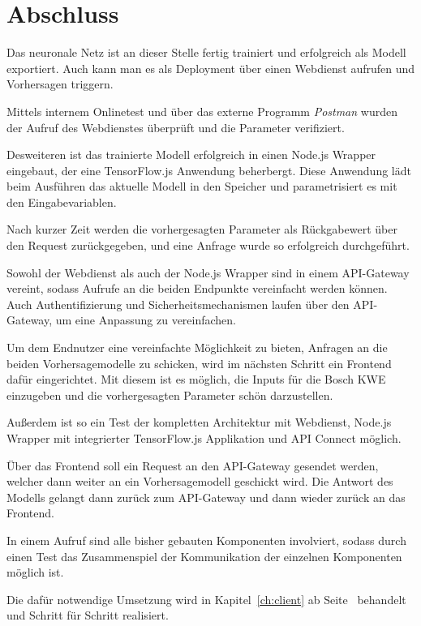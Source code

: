 \section{Abschluss}
Das neuronale Netz ist an dieser Stelle fertig trainiert und erfolgreich als Modell exportiert. Auch kann man es als
Deployment über einen Webdienst aufrufen und Vorhersagen triggern.

Mittels internem Onlinetest und über das externe Programm \textit{Postman} wurden der Aufruf des Webdienstes überprüft
und die Parameter verifiziert.

Desweiteren ist das trainierte Modell erfolgreich in einen Node.js Wrapper eingebaut, der eine TensorFlow.js
Anwendung beherbergt. Diese Anwendung lädt beim Ausführen das aktuelle Modell in den Speicher und parametrisiert es
mit den Eingabevariablen.

Nach kurzer Zeit werden die vorhergesagten Parameter als Rückgabewert über den Request zurückgegeben, und eine Anfrage
wurde so erfolgreich durchgeführt.

Sowohl der Webdienst als auch der Node.js Wrapper sind in einem API-Gateway vereint, sodass Aufrufe an die beiden
Endpunkte vereinfacht werden können. Auch Authentifizierung und Sicherheitsmechanismen laufen über den API-Gateway, um
eine Anpassung zu vereinfachen.

Um dem Endnutzer eine vereinfachte Möglichkeit zu bieten, Anfragen an die beiden Vorhersagemodelle zu schicken, wird
im nächsten Schritt ein Frontend dafür eingerichtet. Mit diesem ist es möglich, die Inputs für die Bosch KWE einzugeben
und die vorhergesagten Parameter schön darzustellen.

Außerdem ist so ein Test der kompletten Architektur mit Webdienst, Node.js Wrapper mit integrierter TensorFlow.js
Applikation und API Connect möglich.

Über das Frontend soll ein Request an den API-Gateway gesendet werden, welcher dann weiter an ein Vorhersagemodell
geschickt wird. Die Antwort des Modells gelangt dann zurück zum API-Gateway und dann wieder zurück an das Frontend.

In einem Aufruf sind alle bisher gebauten Komponenten involviert, sodass durch einen Test das Zusammenspiel der
Kommunikation der einzelnen Komponenten möglich ist.

Die dafür notwendige Umsetzung wird in Kapitel~\ref{ch:client} ab Seite~\pageref{ch:client} behandelt und Schritt für
Schritt realisiert.
